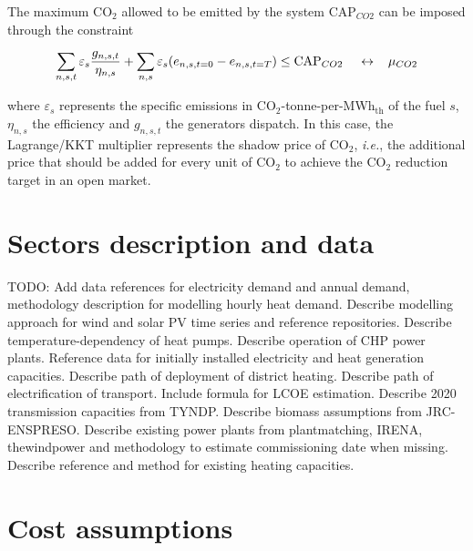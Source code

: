 \documentclass[3p]{elsarticle} %
\def\th{${}_{\textrm{th}}$}
\begin{document}
The maximum CO$_2$ allowed to be emitted by the system $\textrm{CAP}_{CO2}$ can be imposed through the constraint 

\begin{equation}
  \sum_{n,s,t}  \varepsilon_{s} \frac{ g_{n,s,t} }{\eta_{n,s}} + \sum_{n,s} \varepsilon_{s} (e_{n,s,t=0} - e_{n,s,t=T})  \leq  \textrm{CAP}_{CO2} \hspace{.4cm} \leftrightarrow \hspace{0.3cm} \mu_{CO2} \label{eq_co2cap}
\end{equation}

where $\varepsilon_{s}$ represents the specific emissions in CO$_2$-tonne-per-MWh\th{} of the fuel $s$, $\eta_{n,s}$ the efficiency and $g_{n,s,t}$ the generators dispatch. In this case, the Lagrange/KKT multiplier represents the shadow price of CO$_2$, \textit{i.e.}, the additional price that should be added for every unit of CO$_2$ to achieve the CO$_2$ reduction target in an open market. 

\section{Sectors description and data}

\textcolor[rgb]{1,0,0}{TODO: Add data references for electricity demand and annual demand, methodology description for modelling hourly heat demand. Describe modelling approach for wind and solar PV time series and reference repositories. 
Describe temperature-dependency of heat pumps. Describe operation of CHP power plants. 
Reference data for initially installed electricity and heat generation capacities. Describe path of deployment of district heating. Describe path of electrification of transport. Include formula for LCOE estimation.  Describe 2020 transmission capacities from TYNDP. Describe biomass assumptions from JRC-ENSPRESO. Describe existing power plants from plantmatching, IRENA, thewindpower and methodology to estimate commissioning date when missing. Describe reference and method for existing heating capacities.}

\section{Cost assumptions}	
\end{document}
